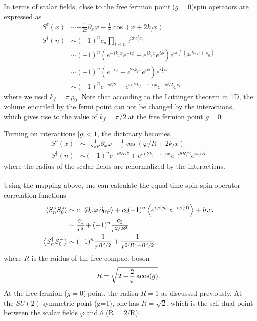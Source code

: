 In terms of scalar fields, close to the free fermion point ($g=0$)spin operators are expressed as
\begin{equation}
	\begin{aligned}
		S^z(x) &\sim - \frac{1}{2\pi}\partial_x \varphi - \frac{1}{\pi}\cos (\varphi + 2k_f x) \\
		S^\dagger(n) &\sim \left(-1\right)^n c_n \prod_{i<n}e^{i\pi\,c_i^\dagger c_i} \\
		& \sim (-1)^n \left( e^{-ik_f x} e^{-i\phi} + e^{ik_f x}e^{i\bar{\phi}}\right) e^{i\pi \int \left(\frac{1}{2\pi}\partial_x \varphi + \rho_0\right)}\\
		&\sim (-1)^n \left( e^{-i\phi} + e^{2ik_f x} e^{i\bar{\phi}}\right) e^{i\frac{1}{2} \varphi}\\
		&\sim (-1)^n e^{-i\theta/2} + e^{i\left(2k_f+\pi\right)x}e^{-i\theta/2} e^{i\varphi}
	\end{aligned}
\end{equation}
where we used $k_f = \pi \,\rho_0$. Note that according to the Luttinger theorem in 1D, the volume encircled by the fermi point can not be changed by the interactions, which gives rise to the value of $k_f = \pi/2$ at the free fermion point $g=0$. 

Turning on interactions $|g|<1$, the dictonary becomes
\begin{equation}
	\begin{aligned}
		S^z(x) &\sim - \frac{1}{2\pi R}\partial_x \varphi - \frac{1}{\pi}\cos (\varphi/R + 2k_f x) \\
		S^\dagger(n) &\sim (-1)^n e^{-i\theta R/2} + e^{i\left(2k_f+\pi\right)x} \,e^{-i\theta R /2} e^{i\varphi/R}
	\end{aligned}
\end{equation}
where the radius of the scalar fields are renormalized by the interactions. \\

 \\
Using the mapping above, one can calculate the equal-time spin-spin operator correlation functions
\begin{equation}
	\begin{aligned}
		\expval{S_n^z S^z_0} &\sim c_1 \left\langle\partial_n \varphi\, \partial_0 \varphi \right\rangle + c_2 (-1)^n \left\langle e^ {i\varphi(n)}\,e^{-i\varphi(0)}\right\rangle + h.c. \\ 
		& \sim \frac{c_1}{r^2} + (-1)^n\frac{c_2}{r^{2/R^2}} \\
		\expval{S^\dagger_n S^-_0} &\sim (-1)^n \frac{1}{r^{R^2/2}} + \frac{1}{r^{2/R^2+R^2/2}}. \\
	\end{aligned}
\end{equation}
where $R$ is the raidus of the free compact boson
\begin{equation}
	R = \sqrt{2-\frac{2}{\pi}\acosine (g)}.
\end{equation}
At the free fermion ($g=0$) point, the radisu $R=1$ as discussed previously. At the $SU(2)$ symmetric point (g=1), one has $R=\sqrt{2}$, which is the self-dual point between the scalar fields $\varphi$ and $\theta$ (R = 2/R).\\

